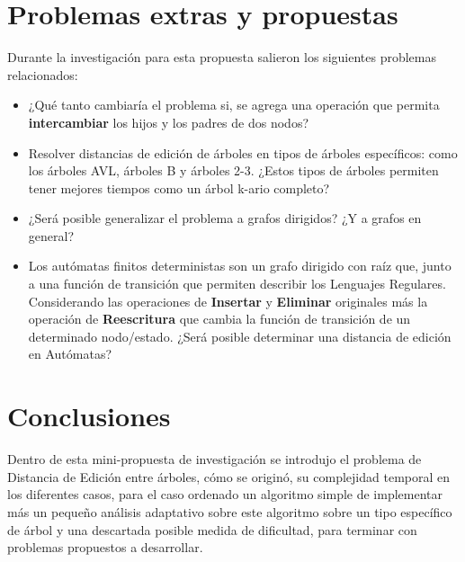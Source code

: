 \documentclass{article}
\begin{document}
\section{Problemas extras y propuestas}
Durante la investigación para esta propuesta salieron los siguientes problemas relacionados:
\begin{itemize}
\item ¿Qué tanto cambiaría el problema si, se agrega una operación que permita \textbf{intercambiar} los hijos y los padres de dos nodos?
\item Resolver distancias de edición de árboles en tipos de árboles específicos: como los árboles AVL, árboles B y árboles 2-3. ¿Estos tipos de árboles permiten tener mejores tiempos como un árbol k-ario completo?
\item ¿Será posible generalizar el problema a grafos dirigidos? ¿Y a grafos en general?
\item Los autómatas finitos deterministas son un grafo dirigido con raíz que, junto a una función de transición que permiten describir los Lenguajes Regulares. Considerando las operaciones de \textbf{Insertar} y \textbf{Eliminar} originales más la operación de \textbf{Reescritura} que cambia la función de transición de un determinado nodo/estado. ¿Será posible determinar una distancia de edición en Autómatas?
\end{itemize}

\section{Conclusiones}
Dentro de esta mini-propuesta de investigación se introdujo el problema de Distancia de Edición entre árboles, cómo se originó, su complejidad temporal en los diferentes casos, para el caso ordenado un algoritmo simple de implementar más un pequeño análisis adaptativo sobre este algoritmo sobre un tipo específico de árbol y una descartada posible medida de dificultad, para terminar con problemas propuestos a desarrollar.
\end{document}
